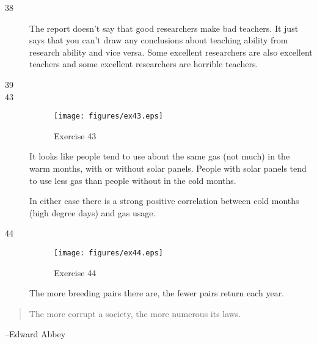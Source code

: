 \documentclass[letterpaper, landscape]{exam}
\begin{document}
\begin{description}
      \item[38]
        The report doesn't say that good researchers make bad teachers.  It just says that
        you can't draw any conclusions about teaching ability from research ability and
        vice versa.  Some excellent researchers are also excellent teachers and some
        excellent researchers are horrible teachers.

      \item[39]

      \item[43]
        \begin{figure}[H]
          \centering
          \texttt{[image: figures/ex43.eps]}
          \caption{Exercise 43}
        \end{figure}

        It looks like people tend to use about the same gas (not much) in the warm months,
        with or without solar panels.  People with solar panels tend to use less gas than
        people without in the cold months.

        In either case there is a strong positive correlation between cold months (high
        degree days) and gas usage.

      \item[44]
        \begin{figure}[H]
          \centering
          \texttt{[image: figures/ex44.eps]}
          \caption{Exercise 44}
        \end{figure}

        The more breeding pairs there are, the fewer pairs return each year.
    \end{description}


  \else
    \vspace{10 cm}
    \begin{quote}
      \begin{em}
        The more corrupt a society, the more numerous its laws.
      \end{em}
    \end{quote}
    \hspace{1 cm} --Edward Abbey
  \fi
\end{document}
